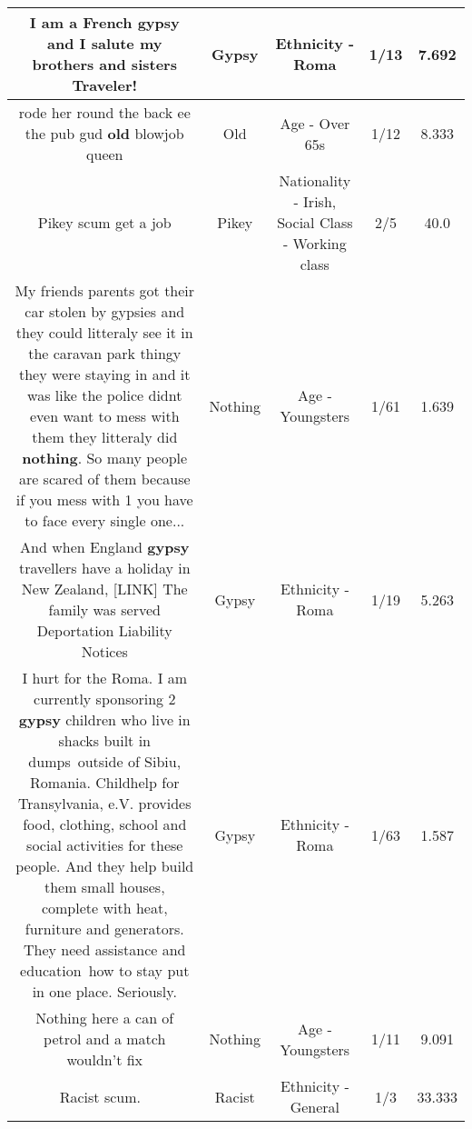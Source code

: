 \documentclass[11pt]{article}
\newlength\mylength
\begin{document}
\begin{center}
\begin{longtable}{|C{.65\mylength}|C{.30\mylength}|C{.12\mylength}|C{.12\mylength}|C{.12\mylength}|}
  \small I am a French \textbf{gypsy} and I salute my brothers and sisters Traveler!\normalsize   & Gypsy & Ethnicity - Roma & 1/13 & 7.692 \\  \hline
  \small rode her round the back ee the pub gud \textbf{old} blowjob queen\normalsize   & Old & Age - Over 65s & 1/12 & 8.333 \\  \hline
  \small Pikey scum get a job\normalsize   & Pikey & Nationality - Irish, Social Class - Working class & 2/5 & 40.0 \\  \hline
  \small My friends parents got their car stolen by gypsies and they could litteraly see it in the caravan park thingy they were staying in and it was like the police didnt even want to mess with them they litteraly did \textbf{nothing}. So many people are scared of them because if you mess with 1 you have to face every single one...\normalsize   & Nothing & Age - Youngsters & 1/61 & 1.639 \\  \hline
  \small And when England \textbf{gypsy} travellers have a holiday in New Zealand, [LINK] The family was served Deportation Liability Notices\normalsize   & Gypsy & Ethnicity - Roma & 1/19 & 5.263 \\  \hline
  \small I hurt for the Roma. I am currently sponsoring 2 \textbf{gypsy} children who live in shacks built in dumps outside of Sibiu, Romania. Childhelp for Transylvania, e.V. provides food, clothing, school and social activities for these people. And they help build them small houses, complete with heat, furniture and generators. They need assistance and education how to stay put in one place. Seriously.\normalsize   & Gypsy & Ethnicity - Roma & 1/63 & 1.587 \\  \hline
  \small Nothing here a can of petrol and a match wouldn't fix\normalsize   & Nothing & Age - Youngsters & 1/11 & 9.091 \\  \hline
  \small Racist scum. 🖕\normalsize   & Racist & Ethnicity - General & 1/3 & 33.333 \\  \hline

\end{longtable}
\end{center}
\end{document}
